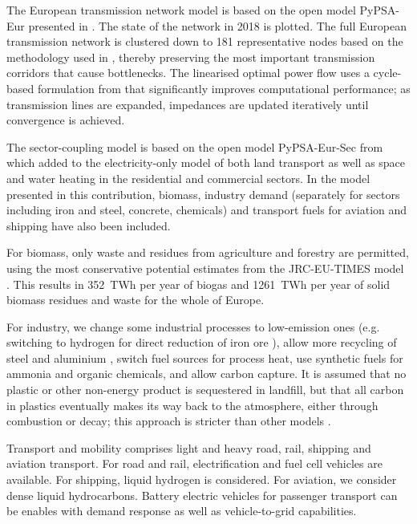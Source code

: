The European transmission network model is based on the open model PyPSA-Eur
presented in \cite{horschPyPSAEurOpen2018}. The state of the network in 2018 is plotted. The full European transmission network is clustered
down to 181 representative nodes based on the methodology used in
\cite{Hoersch2017}, thereby preserving the most important transmission corridors
that cause bottlenecks. The linearised optimal power flow uses a cycle-based
formulation from \cite{horschLinearOptimal2018} that significantly improves computational
performance; as transmission lines are expanded, impedances are updated
iteratively until convergence is achieved.

The sector-coupling model is based on the open model PyPSA-Eur-Sec from
\cite{brownSynergiesSector2018} which added to the electricity-only model of
\cite{schlachtbergerBenefitsCooperation2017} both land transport as well as space and water heating
in the residential and commercial sectors. In the model presented in this
contribution, biomass, industry demand (separately for sectors including iron
and steel, concrete, chemicals) and transport fuels for aviation and shipping
have also been included.

For biomass, only waste and residues from agriculture and forestry are
permitted, using the most conservative potential estimates from the JRC-EU-TIMES
model \cite{jrcbiomass2015}. This results in 352~TWh per year of biogas and
1261~TWh per year of solid biomass residues and waste for the whole of Europe.

For industry, we change some industrial processes to low-emission ones (e.g.
switching to hydrogen for direct reduction of iron ore \cite{voglAssessmentHydrogen2018}), allow
more recycling of steel and aluminium \cite{circular_economy}, switch fuel
sources for process heat, use synthetic fuels for ammonia and organic chemicals,
and allow carbon capture. It is assumed that no plastic or other non-energy
product is sequestered in landfill, but that all carbon in plastics eventually
makes its way back to the atmosphere, either through combustion or decay; this
approach is stricter than other models \cite{in-depth_2018}.

Transport and mobility comprises light and heavy road, rail, shipping and
aviation transport. For road and rail, electrification and fuel cell vehicles are
available. For shipping, liquid hydrogen is considered. For aviation, we
consider dense liquid hydrocarbons. Battery electric vehicles for passenger
transport can be enables with demand response as well as vehicle-to-grid
capabilities.

